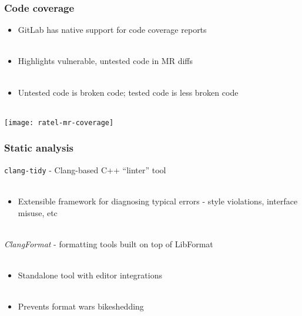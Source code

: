 \documentclass{beamer}
\begin{document}

\begin{frame}
\begin{center}
\frametitle{Code coverage}

\begin{itemize}

\item GitLab has native support for code coverage reports\\

~\\

\item Highlights vulnerable, untested code in MR diffs\\

~\\

\item Untested code is broken code; tested code is less broken code\\

\end{itemize}

~\\

\texttt{[image: ratel-mr-coverage]}

\end{center}
\end{frame}


\begin{frame}
\begin{center}
\frametitle{Static analysis}

\lstinline{clang-tidy} - Clang-based C++ “linter” tool\\

~\\

\begin{itemize}

\item Extensible framework for diagnosing typical errors - style violations, interface misuse, etc

\end{itemize}

~\\

{\it ClangFormat} - formatting tools built on top of LibFormat\\

~\\

\begin{itemize}

\item Standalone tool with editor integrations\\

~\\

\item Prevents format wars bikeshedding

\end{itemize}

\end{center}
\end{frame}
\end{document}
